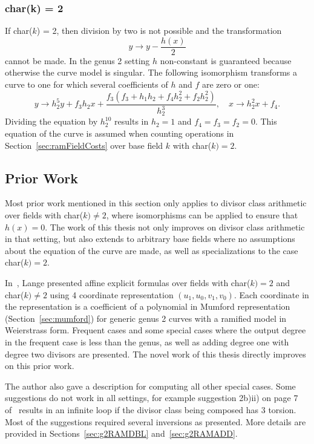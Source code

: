 \subsubsection{char(k) = 2}
If char($k$) = 2, then division by two is not
possible and the transformation $$ y \rightarrow y - \frac{h(x)}{2}$$ cannot be
made. In the genus 2 setting $h$ non-constant is guaranteed because otherwise
the curve model is singular. The following isomorphism transforms a curve to
one for which several coefficients of $h$ and $f$ are zero or one: $$ y
\rightarrow h_2^5y + f_3h_2x + \frac{f_3(f_3 + h_1h_2 + f_4h_2^2 +
f_2h_2^2)}{h_2^3}, \quad x\rightarrow h_2^2x + f_4.$$ Dividing the equation by
$h_2^{10}$ results in $h_2 =1$ and $f_4 = f_3 = f_2 = 0$. This equation of the curve
is assumed when counting operations in Section~\ref{sec:ramFieldCosts} over
base field $k$ with char($k) = 2$. 

\subsection{Prior Work}
\label{sec:g2explRAMPriorWork}
Most prior work mentioned in this section only applies to divisor class
arithmetic over fields with char($k) \not = 2$, where isomorphisms can be
applied to ensure that $h(x) = 0$. The work of this thesis not only improves on
divisor class arithmetic in that setting, but also extends to arbitrary base
fields where no assumptions about the equation of the curve are made,  as well as
specializations to the case char($k) = 2$.

In~\cite{Lange_explicit_2005}, Lange presented affine explicit formulas over
fields with char($k) = 2$ and char($k) \not = 2$ using 4 coordinate
representation $(u_1,u_0,v_1,v_0)$. Each coordinate in the representation is a coefficient of
a polynomial in Mumford representation (Section~\ref{sec:mumford}) for
generic genus 2 curves with a ramified model in Weierstrass form. Frequent cases
and some special cases where the output degree in the frequent case is less than
the genus, as well as adding degree one with degree two divisors are presented.
The novel work of this thesis directly improves on this prior work.

The author also gave a description for computing all other special cases. Some
suggestions do not work in all settings, for example suggestion 2b)ii) on page
7 of~\cite[Section~4.1]{Lange_explicit_2005} results in an infinite loop if the
divisor class being composed has 3 torsion. Most of the suggestions required
several inversions as presented. More details are provided in
Sections~\ref{sec:g2RAMDBL} and~\ref{sec:g2RAMADD}.

